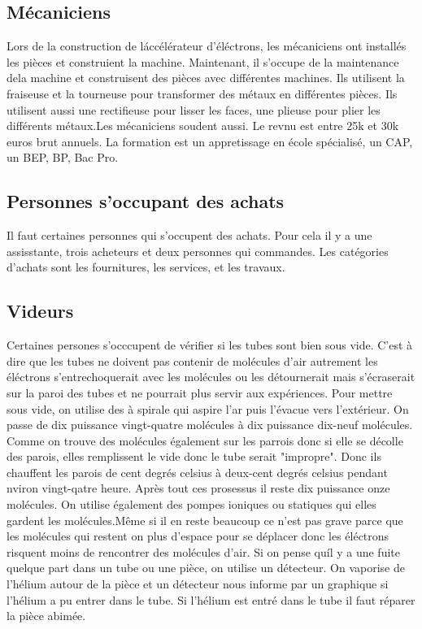		\subsection{Mécaniciens}
			Lors de la construction de láccélérateur d'éléctrons, les mécaniciens ont installés les pièces et construient la machine. 
			Maintenant, il s'occupe de la maintenance dela machine et construisent des pièces avec différentes machines.
			Ils utilisent la fraiseuse et la tourneuse pour transformer des métaux en différentes pièces. Ils utilisent aussi une rectifieuse pour lisser les faces, une plieuse pour plier les différents métaux.Les mécaniciens soudent aussi.
			Le revnu est entre 25k et 30k euros brut annuels. La formation est un appretissage en école spécialisé, un CAP, un BEP, BP, Bac Pro.
		\subsection{Personnes s'occupant des achats}
			Il faut certaines personnes qui s'occupent des achats. Pour cela il y a une assisstante, trois acheteurs et deux personnes qui commandes. Les catégories d'achats sont les fournitures, les services, et les travaux.
		\subsection{Videurs}
			Certaines persones s'occcupent de vérifier si les tubes sont bien sous vide. C'est à dire que les tubes ne doivent pas contenir de molécules d'air autrement les éléctrons s'entrechoquerait avec les molécules ou les détournerait mais s'écraserait sur la paroi des tubes et ne pourrait plus servir aux expériences.
			Pour mettre sous vide, on utilise des à spirale qui aspire l'ar puis l'évacue vers l'extérieur. On passe de dix puissance vingt-quatre molécules à dix puissance dix-neuf molécules. Comme on trouve des molécules également sur les parrois donc si elle se décolle des parois, elles remplissent le vide donc le tube serait "impropre". Donc ils chauffent les parois de cent degrés celsius à deux-cent degrés celsius pendant nviron vingt-qatre heure. Après tout ces prosessus il reste dix puissance onze molécules. On utilise également des pompes ioniques ou statiques qui elles gardent les molécules.Même si il en reste beaucoup ce n'est pas grave parce que les molécules qui restent on plus d'espace pour se déplacer donc les éléctrons risquent moins de rencontrer des molécules d'air. Si on pense quíl y a une fuite quelque part dans un tube ou une pièce, on utilise un détecteur. On vaporise de l'hélium autour de la pièce et un détecteur nous informe par un graphique si l'hélium a pu entrer dans le tube. Si l'hélium est entré dans le tube il faut réparer la pièce abimée.  
